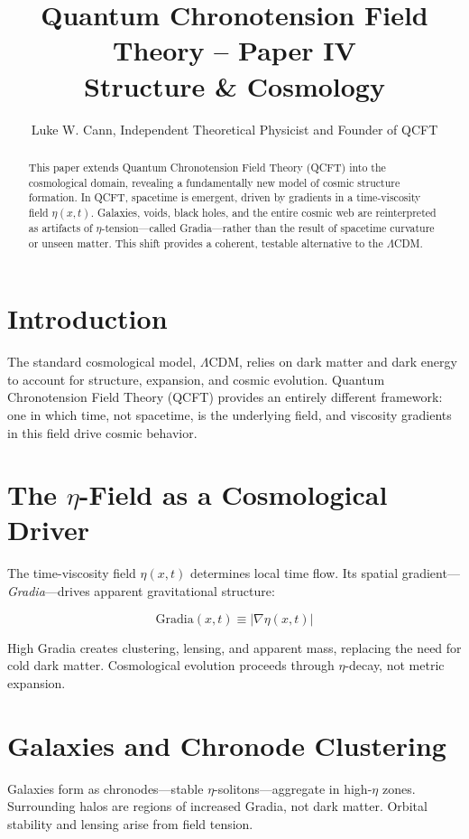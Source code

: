 \documentclass[12pt]{article}
\title{Quantum Chronotension Field Theory – Paper IV\\\large Structure \& Cosmology}
\author{Luke W. Cann, Independent Theoretical Physicist and Founder of QCFT}
\date{}
\begin{document}
\maketitle

\begin{abstract}
This paper extends Quantum Chronotension Field Theory (QCFT) into the cosmological domain, revealing a fundamentally new model of cosmic structure formation. In QCFT, spacetime is emergent, driven by gradients in a time-viscosity field $\eta(x,t)$. Galaxies, voids, black holes, and the entire cosmic web are reinterpreted as artifacts of $\eta$-tension---called Gradia---rather than the result of spacetime curvature or unseen matter. This shift provides a coherent, testable alternative to the $\Lambda$CDM.
\end{abstract}

\section{Introduction}

The standard cosmological model, $\Lambda$CDM, relies on dark matter and dark energy to account for structure, expansion, and cosmic evolution. Quantum Chronotension Field Theory (QCFT) provides an entirely different framework: one in which time, not spacetime, is the underlying field, and viscosity gradients in this field drive cosmic behavior.

\section{The $\eta$-Field as a Cosmological Driver}

The time-viscosity field $\eta(x,t)$ determines local time flow. Its spatial gradient---\emph{Gradia}---drives apparent gravitational structure:

\[
\text{Gradia}(x,t) \equiv |\nabla \eta(x,t)|
\]

High Gradia creates clustering, lensing, and apparent mass, replacing the need for cold dark matter. Cosmological evolution proceeds through $\eta$-decay, not metric expansion.

\section{Galaxies and Chronode Clustering}

Galaxies form as chronodes---stable $\eta$-solitons---aggregate in high-$\eta$ zones. Surrounding halos are regions of increased Gradia, not dark matter. Orbital stability and lensing arise from field tension.
\end{document}

